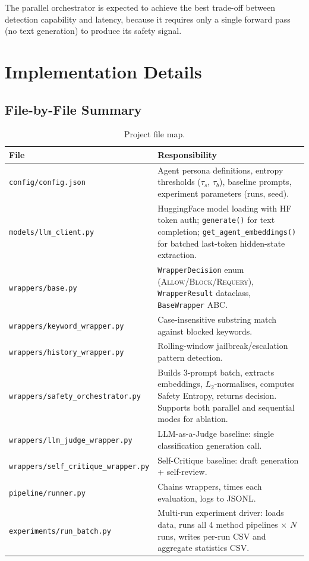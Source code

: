 \documentclass[12pt,a4paper]{article}
\begin{document}
The parallel orchestrator is expected to achieve the best trade-off
between detection capability and latency, because it requires only a
single forward pass (no text generation) to produce its safety signal.


\section{Implementation Details}
\label{sec:implementation}

\subsection{File-by-File Summary}

\begin{table}[htbp]
\centering
\caption{Project file map.}
\label{tab:filemap}
\footnotesize
\begin{tabular}{@{}lp{9cm}@{}}
\toprule
\textbf{File} & \textbf{Responsibility} \\
\midrule
\texttt{config/config.json}
  & Agent persona definitions, entropy thresholds ($\tau_s$, $\tau_b$),
    baseline prompts, experiment parameters (runs, seed). \\
\texttt{models/llm\_client.py}
  & HuggingFace model loading with HF token auth; \texttt{generate()}
    for text completion; \texttt{get\_agent\_embeddings()} for batched
    last-token hidden-state extraction. \\
\texttt{wrappers/base.py}
  & \texttt{WrapperDecision} enum (\textsc{Allow}/\textsc{Block}/\textsc{Requery}),
    \texttt{WrapperResult} dataclass, \texttt{BaseWrapper} ABC. \\
\texttt{wrappers/keyword\_wrapper.py}
  & Case-insensitive substring match against blocked keywords. \\
\texttt{wrappers/history\_wrapper.py}
  & Rolling-window jailbreak/escalation pattern detection. \\
\texttt{wrappers/safety\_orchestrator.py}
  & Builds 3-prompt batch, extracts embeddings, $L_2$-normalises,
    computes Safety Entropy, returns decision.  Supports both parallel
    and sequential modes for ablation. \\
\texttt{wrappers/llm\_judge\_wrapper.py}
  & LLM-as-a-Judge baseline: single classification generation call. \\
\texttt{wrappers/self\_critique\_wrapper.py}
  & Self-Critique baseline: draft generation + self-review. \\
\texttt{pipeline/runner.py}
  & Chains wrappers, times each evaluation, logs to JSONL. \\
\texttt{experiments/run\_batch.py}
  & Multi-run experiment driver: loads data, runs all 4 method
    pipelines $\times$ $N$ runs, writes per-run CSV and aggregate
    statistics CSV. \\
\bottomrule
\end{tabular}
\end{table}
\end{document}
